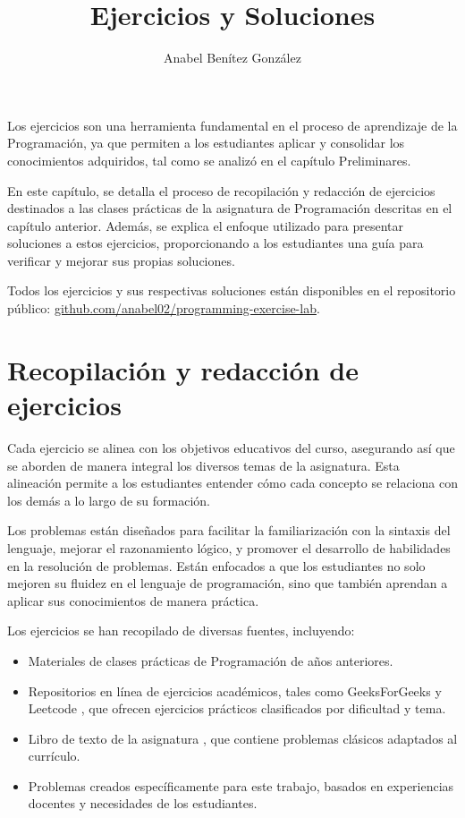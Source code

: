 \documentclass{article}
\title{Ejercicios y Soluciones}
\author{Anabel Benítez González}
\date{}
\begin{document}

\maketitle

Los ejercicios son una herramienta fundamental en el proceso de aprendizaje de la Programación, ya que permiten a los estudiantes aplicar y consolidar los conocimientos adquiridos, tal como se analizó en el capítulo Preliminares. 

En este capítulo, se detalla el proceso de recopilación y redacción de ejercicios destinados a las clases prácticas de la asignatura de Programación descritas en el capítulo anterior. Además, se explica el enfoque utilizado para presentar soluciones a estos ejercicios, proporcionando a los estudiantes una guía para verificar y mejorar sus propias soluciones.

Todos los ejercicios y sus respectivas soluciones están disponibles en el repositorio público: \href{https://github.com/anabel02/programming-exercise-lab}{github.com/anabel02/programming-exercise-lab}.

\section{Recopilación y redacción de ejercicios}
Cada ejercicio se alinea con los objetivos educativos del curso, asegurando así que se aborden de manera integral los diversos temas de la asignatura. Esta alineación permite a los estudiantes entender cómo cada concepto se relaciona con los demás a lo largo de su formación.

Los problemas están diseñados para facilitar la familiarización con la sintaxis del lenguaje, mejorar el razonamiento lógico, y promover el desarrollo de habilidades en la resolución de problemas. Están enfocados a que los estudiantes no solo mejoren su fluidez en el lenguaje de programación, sino que también aprendan a aplicar sus conocimientos de manera práctica. 

Los ejercicios se han recopilado de diversas fuentes, incluyendo:
\begin{itemize}
    \item Materiales de clases prácticas de Programación de años anteriores.
    \item Repositorios en línea de ejercicios académicos, tales como GeeksForGeeks \cite{geeksforgeeks} y Leetcode \cite{leetcode}, que ofrecen ejercicios prácticos clasificados por dificultad y tema.
    \item Libro de texto de la asignatura \cite{katrib_programar}, que contiene problemas clásicos adaptados al currículo.
    \item Problemas creados específicamente para este trabajo, basados en experiencias docentes y necesidades de los estudiantes.
\end{itemize}
\end{document}
